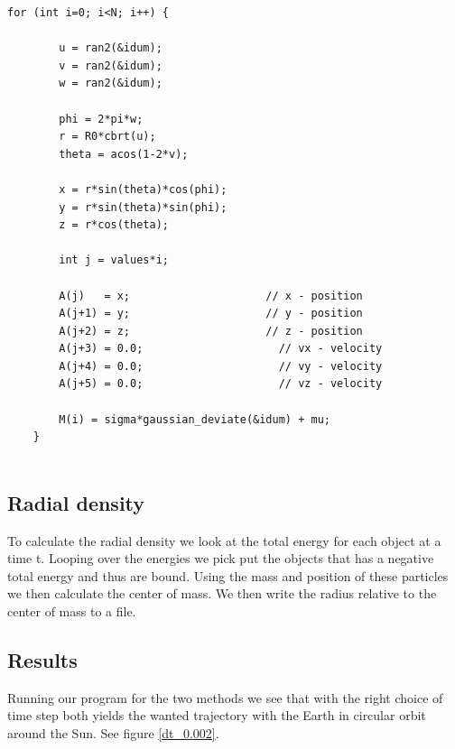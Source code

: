 \documentclass[a4paper,12pt, english]{article}
\begin{document}
\begin{lstlisting}[title={Initial conditions for the N-body system}]
    for (int i=0; i<N; i++) {

        u = ran2(&idum);
        v = ran2(&idum);
        w = ran2(&idum);

        phi = 2*pi*w;
        r = R0*cbrt(u);
        theta = acos(1-2*v);

        x = r*sin(theta)*cos(phi);
        y = r*sin(theta)*sin(phi);
        z = r*cos(theta);

        int j = values*i;

        A(j)   = x;                     // x - position
        A(j+1) = y;                     // y - position
        A(j+2) = z;                     // z - position
        A(j+3) = 0.0;                     // vx - velocity
        A(j+4) = 0.0;                     // vy - velocity
        A(j+5) = 0.0;                     // vz - velocity

        M(i) = sigma*gaussian_deviate(&idum) + mu;
    }
  
\end{lstlisting}


\subsection*{Radial density}
To calculate the radial density we look at the total energy for each object at a time t. Looping over the energies we pick put the objects that has a negative total energy and thus are bound. Using the mass and position of these particles we then calculate the center of mass. We then write the radius relative to the center of mass to a file.   


   
\subsection*{Results}

Running our program for the two methods we see that with the right choice of time step both yields the wanted trajectory with the Earth in circular orbit around the Sun. See figure \ref{dt_0.002}. 
\end{document}
